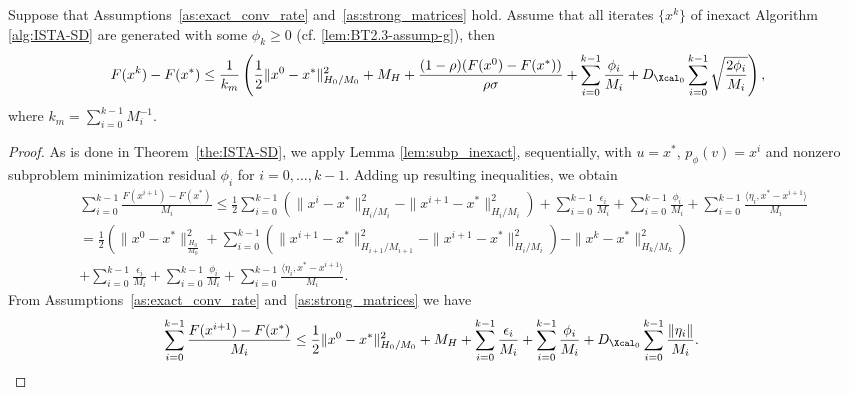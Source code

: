 \documentclass[11pt]{article}
\numberwithin{equation}{section}
\begin{document}
  \begin{theorem}\label{th:inexact_conv_rate}
 Suppose that Assumptions~\ref{as:exact_conv_rate} and~\ref{as:strong_matrices} hold. 
 Assume that all iterates $\{x^k\}$ of inexact Algorithm \ref{alg:ISTA-SD} are generated with some $\phi_k\geq 0$ (cf. \eqref{lem:BT2.3-assump-g}), then
 \begin{align}
     \label{eq:bound_F_F*}
     F(x^k) - F(x^*) \leq 
     \frac{1}{k_m} \left( \frac{1}{2} \|x^0-x^*\|_{H_0/M_0}^2 
     + M_H+ \frac{(1-\rho)(F(x^0)-F(x^*))}{\rho\sigma} 
     + \sum_{i=0}^{k-1}\frac{\phi_i}{M_i}
     + D_{\Xcal_0}\sum_{i=0}^{k-1} \sqrt{\frac{2\phi_i}{M_i}} \right),
 \end{align}
 where $k_m=\sum_{i=0}^{k-1}M_i^{-1}$.
 \end{theorem}


 \begin{proof}
     As is done in Theorem~\ref{the:ISTA-SD},  we apply Lemma \ref{lem:subp_inexact}, sequentially, with $u=x^*$, $p_{\phi}(v)=x^i$ and nonzero subproblem minimization residual $\phi_i$ for $i=0, \ldots, k-1$. Adding up resulting inequalities, we obtain  
     \begin{align}
         &\sum_{i=0}^{k-1} \frac{F(x^{i+1}) - F(x^*)}{M_i}\leq 
         \frac{1}{2} \sum_{i=0}^{k-1} \left(\|x^i-x^*\|_{H_i/M_i}^2 
         - \|x^{i+1}-x^*\|_{H_i/M_i}^2 \right) 
         + \sum_{i=0}^{k-1} \frac{\epsilon_i}{M_i} 
         + \sum_{i=0}^{k-1} \frac{\phi_i}{M_i} 
         + \sum_{i=0}^{k-1} \frac{\langle \eta_i,x^* - x^{i+1} \rangle}{M_i}\nonumber   \\
         \label{equ:bound_F_diff}
         &= 
          \frac{1}{2} \left( \|x^0-x^*\|_{\frac{H_0}{M_0}}^2 
         + \sum_{i=0}^{k-1}(\|x^{i+1} - x^*\|^2_{H_{i+1}/M_{i+1}}-\|x^{i+1} - x^*\|^2_{H_i/M_i})
         - \|x^k-x^*\|_{H_k/M_k}^2 \right) \\
         &\nonumber + \sum_{i=0}^{k-1} \frac{\epsilon_i}{M_i} 
         + \sum_{i=0}^{k-1} \frac{\phi_i}{M_i} 
         + \sum_{i=0}^{k-1} \frac{\langle \eta_i,x^* - x^{i+1} \rangle}{M_i}.
         \end{align}
         From Assumptions~\ref{as:exact_conv_rate} and~\ref{as:strong_matrices} we have
         \begin{align*}
         &\sum_{i=0}^{k-1} \frac{F(x^{i+1}) - F(x^*)}{M_i} \leq 
         \frac{1}{2} \|x^0-x^*\|_{H_0/M_0}^2 +M_H
         + \sum_{i=0}^{k-1} \frac{\epsilon_i}{M_i} 
         + \sum_{i=0}^{k-1} \frac{\phi_i}{M_i} 
         + D_{\Xcal_0}\sum_{i=0}^{k-1} \frac{\|\eta_i\|}{M_i}. 

\end{align*}
\end{proof}
\end{document}
